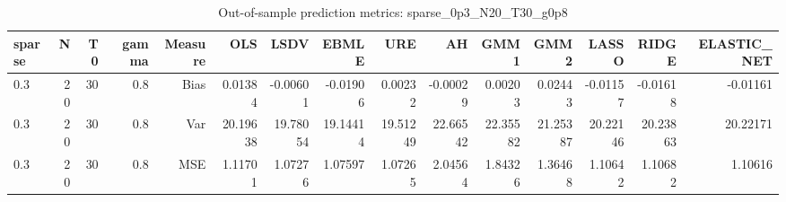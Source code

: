 \begin{table}[!htbp]\centering
\caption{Out-of-sample prediction metrics: sparse_0p3_N20_T30_g0p8}
\label{tab:table3_sparse_0p3_N20_T30_g0p8}
\begin{tabular}{lrrrrrrrrrrrrrr}
\hline
sparse & N & T0 & gamma & Measure & OLS & LSDV & EBMLE & URE & AH & GMM1 & GMM2 & LASSO & RIDGE & ELASTIC_NET \\
\hline
0.3 & 20 & 30 & 0.8 & Bias & 0.01384 & -0.00601 & -0.01906 & 0.00232 & -0.00029 & 0.00203 & 0.02443 & -0.01157 & -0.01618 & -0.01161 \\
0.3 & 20 & 30 & 0.8 & Var & 20.19638 & 19.78054 & 19.14414 & 19.51249 & 22.66542 & 22.35582 & 21.25387 & 20.22146 & 20.23863 & 20.22171 \\
0.3 & 20 & 30 & 0.8 & MSE & 1.11701 & 1.07276 & 1.07597 & 1.07265 & 2.04564 & 1.84326 & 1.36468 & 1.10642 & 1.10682 & 1.10616 \\
\hline
\end{tabular}
\end{table}

